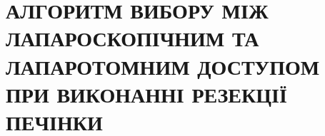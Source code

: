 \chapter{АЛГОРИТМ ВИБОРУ МІЖ ЛАПАРО\-СКО\-ПІЧ\-НИМ ТА ЛАПАРО\-ТОМ\-НИМ ДОСТУПОМ ПРИ ВИКОНАННІ РЕЗЕКЦІЇ ПЕЧІНКИ}